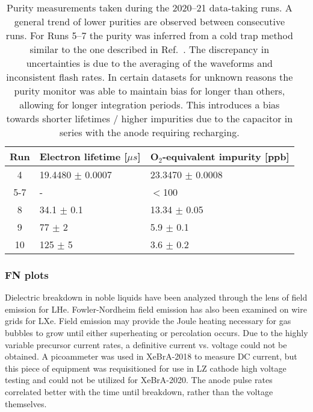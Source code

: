 \begin{table}
    \centering
    \begin{tabular}{|c|l|l|}
    \hline
        Run &  Electron lifetime [$\mu s$] &  O$_2$-equivalent impurity [ppb] \\
       \hline
        4 & 19.4480 $\pm$ 0.0007 & 23.3470 $\pm$ 0.0008 \\
        5-7 & - &  $<$100 \\
        8 & 34.1 $\pm$ 0.1 &13.34 $\pm$ 0.05 \\
        9 & 77 $\pm$ 2 & 5.9 $\pm$ 0.1 \\
        10 & 125 $\pm$ 5 & 3.6 $\pm$ 0.2 \\
        \hline
    \end{tabular}
    \caption{Purity measurements taken during the 2020--21 data-taking runs.
 A general trend of lower purities are observed between consecutive runs.
 For Runs 5--7 the purity was inferred from a cold trap method similar to the one described in Ref.~\cite{leonard_simple_2010}.
 The discrepancy in uncertainties is due to the averaging of the waveforms and inconsistent flash rates.
 In certain datasets for unknown reasons the purity monitor was able to maintain bias for longer than others, allowing for longer integration periods.
 This introduces a bias towards shorter lifetimes / higher impurities due to the capacitor in series with the anode requiring recharging.}
    \label{tab:purity}
\end{table}


\subsubsection{FN plots}

Dielectric breakdown in noble liquids have been analyzed through the lens of field emission for LHe\cite{phan_study_2021}.
Fowler-Nordheim field emission has also been examined on wire grids for LXe\cite{bodnia_electric_2021}.
Field emission may provide the Joule heating necessary for gas bubbles to grow until either superheating or percolation occurs\cite{atrazhev_mechanisms_2010}.
Due to the highly variable precursor current rates, a definitive current vs. voltage could not be obtained.
A picoammeter was used in XeBrA-2018 to measure DC current, but this piece of equipment was requisitioned for use in LZ cathode high voltage testing and could not be utilized for XeBrA-2020.
The anode pulse rates correlated better with the time until breakdown, rather than the voltage themselves.

